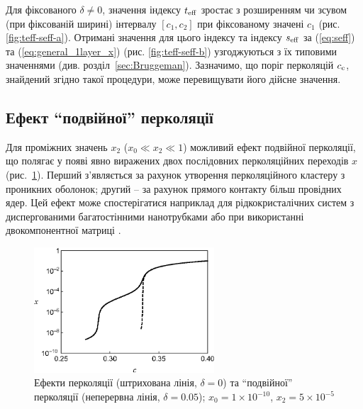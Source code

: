 \documentclass[14pt,twoside]{vakthesis}
\begin{document}

Для фіксованого $\delta \neq 0$, значення індексу $t_{\rm eff}$ зростає з розширенням чи зсувом (при фіксованій ширині) інтервалу $[c_1,c_2]$ при фіксованому значені $c_1$ (рис. \ref{fig:teff-seff-a}). Отримані значення для цього індексу та індексу $s_{\rm eff}$ за (\ref{eq:seff}) та (\ref{eq:general_1layer_x}) (рис. \ref{fig:teff-seff-b}) узгоджуються з їх типовими значеннями (див. розділ~\ref{sec:Bruggeman}). 
Зазначимо, що поріг перколяцій $c_{\rm c}$, знайдений згідно такої процедури, може перевищувати його дійсне значення.


\subsection{Ефект ``подвійної'' перколяції}\label{sec:double-perc}
Для проміжних значень $x_2$ ($x_0 \ll x_2 \ll 1$) можливий ефект подвійної перколяції, що полягає у появі явно виражених двох послідовних перколяційних переходів $x$ (рис.~\ref{fig:percolation}).
Перший з'являється за рахунок утворення перколяційного кластеру з проникних оболонок; другий -- за рахунок прямого контакту більш провідних ядер. Цей ефект може спостерігатися наприклад для рідкокристалічних систем з диспергованими багатостінними нанотрубками \cite{Tomylko2015} або при використанні двокомпонентної матриці \cite{Al-Saleh2008, KonishiY.2006}.

\begin{figure}[tb]
	\centering
	\includegraphics[width=0.6\textwidth]{percolation.eps}
	\caption{\label{fig:percolation}
		Ефекти перколяції (штрихована лінія, $\delta = 0$)
		та ``подвійної'' перколяції (неперервна лінія, $\delta = 0.05$);
		$x_0 = 1 \times 10^{-10}$, $x_2 = 5 \times 10^{-5}$}
\end{figure}
\end{document}
